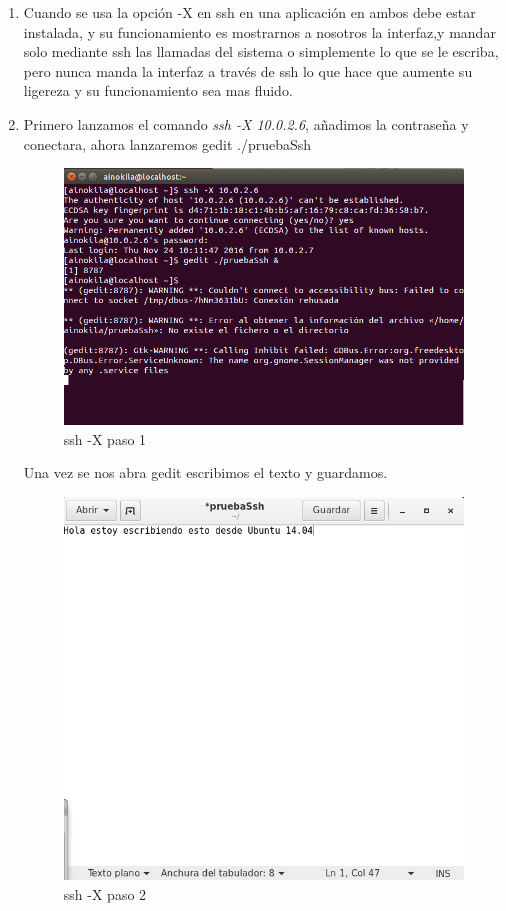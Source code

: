 \begin{enumerate}[label=(\alph*)]
	\item Cuando se usa la opción -X en ssh en una aplicación en ambos debe estar instalada, y su funcionamiento es mostrarnos a nosotros la interfaz,y mandar solo mediante ssh las llamadas del sistema o simplemente lo que se le escriba, pero nunca manda la interfaz a través de ssh lo que hace que aumente su ligereza y su funcionamiento sea mas fluido.	
	
	\item Primero lanzamos el comando \textit{ssh -X 10.0.2.6}, añadimos la contraseña y conectara, ahora lanzaremos gedit ./pruebaSsh 
	
	\begin{figure}[H]
		\centering
		\includegraphics[scale=0.35]{pics/ssh_1.png}  
		\caption{ssh -X paso 1} \label{fig:ssh_1}
	\end{figure}

	Una vez se nos abra gedit escribimos el texto y guardamos.

	\begin{figure}[H]
		\centering
		\includegraphics[scale=0.35]{pics/shh_2.png}  
		\caption{ssh -X paso 2} \label{fig:ssh_2}
	\end{figure}


\end{enumerate}

